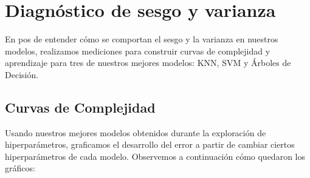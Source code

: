 \section*{Diagnóstico de sesgo y varianza}
En pos de entender cómo se comportan el sesgo y la varianza en nuestros modelos, realizamos mediciones para
construir curvas de complejidad y aprendizaje para tres de nuestros mejores modelos: KNN, SVM y Árboles de Decisión.

\subsection*{Curvas de Complejidad}
Usando nuestros mejores modelos obtenidos durante la exploración de hiperparámetros, graficamos el desarrollo del error
a partir de cambiar ciertos hiperparámetros de cada modelo. Observemos a continuación cómo quedaron los gráficos:

\begin{figure}[H]
    \centering

 
    \vspace{0.1cm}

    \label{fig:distr}
\end{figure}

